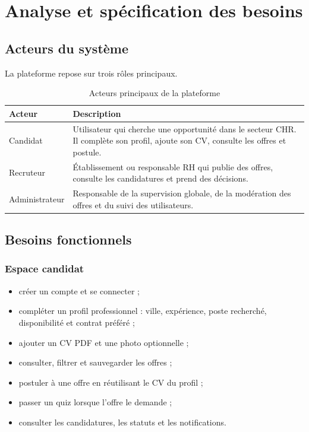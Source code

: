 \chapter{Analyse et spécification des besoins}

\section{Acteurs du système}

\noindent
La plateforme \projectName{} repose sur trois rôles principaux.

\begin{table}[h!]
\centering
\renewcommand{\arraystretch}{1.4}
\begin{tabular}{|p{3cm}|p{10cm}|}
\hline
\textbf{Acteur} & \textbf{Description} \\
\hline
Candidat & Utilisateur qui cherche une opportunité dans le secteur CHR. Il complète son profil, ajoute son CV, consulte les offres et postule. \\
\hline
Recruteur & Établissement ou responsable RH qui publie des offres, consulte les candidatures et prend des décisions. \\
\hline
Administrateur & Responsable de la supervision globale, de la modération des offres et du suivi des utilisateurs. \\
\hline
\end{tabular}
\caption{Acteurs principaux de la plateforme}
\label{tab:acteurs}
\end{table}

\section{Besoins fonctionnels}

\subsection{Espace candidat}

\begin{itemize}
    \item créer un compte et se connecter ;
    \item compléter un profil professionnel : ville, expérience, poste recherché, disponibilité et contrat préféré ;
    \item ajouter un CV PDF et une photo optionnelle ;
    \item consulter, filtrer et sauvegarder les offres ;
    \item postuler à une offre en réutilisant le CV du profil ;
    \item passer un quiz lorsque l'offre le demande ;
    \item consulter les candidatures, les statuts et les notifications.
\end{itemize}

